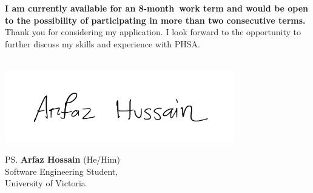 \documentclass[a4paper, 12pt, oneside]{letter}
\newcommand{\CompanyName}{PHSA}
\newcommand{\Terms}{an 8-month}
\begin{document}
{\fontsize{11}{11.5}\selectfont \bfseries I am currently available for \Terms\ work term and would be open to the possibility of participating in more than two consecutive terms.} Thank you for considering my application. I look forward to the opportunity to further discuss my skills and experience with \CompanyName. \\\\
\vspace{10pt}
\vspace{-25pt}\begin{flushleft}
\hspace*{-1cm}\includegraphics[width=10cm]{../../9.1 PreProcessed/signature.png}\vspace{-1cm}
\end{flushleft}
\vspace{-10pt}\ps{\textbf{Arfaz Hossain} (He/Him)\\
Software Engineering Student,\\
University of Victoria} 
\end{document}
